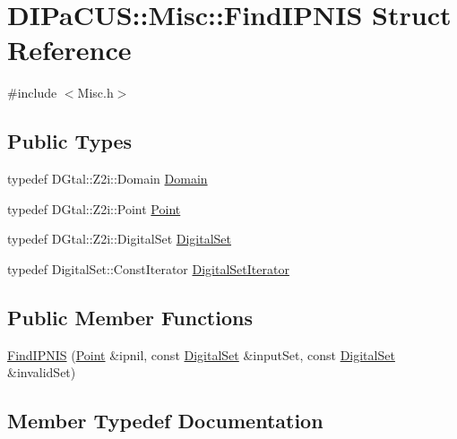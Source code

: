 \hypertarget{structDIPaCUS_1_1Misc_1_1FindIPNIS}{}\section{D\+I\+Pa\+C\+US\+:\+:Misc\+:\+:Find\+I\+P\+N\+IS Struct Reference}
\label{structDIPaCUS_1_1Misc_1_1FindIPNIS}


{\ttfamily \#include $<$Misc.\+h$>$}

\subsection*{Public Types}
\begin{DoxyCompactItemize}
\item 
typedef D\+Gtal\+::\+Z2i\+::\+Domain \mbox{\hyperlink{structDIPaCUS_1_1Misc_1_1FindIPNIS_af7997086b94b72bc970cdb982ad0535a}{Domain}}
\item 
typedef D\+Gtal\+::\+Z2i\+::\+Point \mbox{\hyperlink{structDIPaCUS_1_1Misc_1_1FindIPNIS_af4506f1e1704bc3ee542ee3000694ee1}{Point}}
\item 
typedef D\+Gtal\+::\+Z2i\+::\+Digital\+Set \mbox{\hyperlink{structDIPaCUS_1_1Misc_1_1FindIPNIS_aa92a8a962ef5fb194297977646f84dc4}{Digital\+Set}}
\item 
typedef Digital\+Set\+::\+Const\+Iterator \mbox{\hyperlink{structDIPaCUS_1_1Misc_1_1FindIPNIS_a40979223d434fc5f75ca899cc7add8fd}{Digital\+Set\+Iterator}}
\end{DoxyCompactItemize}
\subsection*{Public Member Functions}
\begin{DoxyCompactItemize}
\item 
\mbox{\hyperlink{structDIPaCUS_1_1Misc_1_1FindIPNIS_a2a14b039bc1efdc8adfa4285d8b65972}{Find\+I\+P\+N\+IS}} (\mbox{\hyperlink{structDIPaCUS_1_1Misc_1_1FindIPNIS_af4506f1e1704bc3ee542ee3000694ee1}{Point}} \&ipnil, const \mbox{\hyperlink{structDIPaCUS_1_1Misc_1_1FindIPNIS_aa92a8a962ef5fb194297977646f84dc4}{Digital\+Set}} \&input\+Set, const \mbox{\hyperlink{structDIPaCUS_1_1Misc_1_1FindIPNIS_aa92a8a962ef5fb194297977646f84dc4}{Digital\+Set}} \&invalid\+Set)
\end{DoxyCompactItemize}


\subsection{Member Typedef Documentation}
\mbox{\label{structDIPaCUS_1_1Misc_1_1FindIPNIS_aa92a8a962ef5fb194297977646f84dc4}} 
